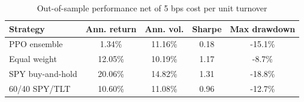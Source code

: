 \begin{table}[H]
\centering
\caption{Out-of-sample performance net of 5 bps cost per unit turnover}
\begin{tabular}{lcccc}
\toprule
Strategy & Ann. return & Ann. vol. & Sharpe & Max drawdown \\
\midrule
PPO ensemble & 1.34\% & 11.16\% & 0.18 & -15.1\% \\
Equal weight & 12.05\% & 10.19\% & 1.17 & -8.7\% \\
SPY buy-and-hold & 20.06\% & 14.82\% & 1.31 & -18.8\% \\
60/40 SPY/TLT & 10.60\% & 11.08\% & 0.96 & -12.7\% \\
\bottomrule
\end{tabular}
\end{table}
